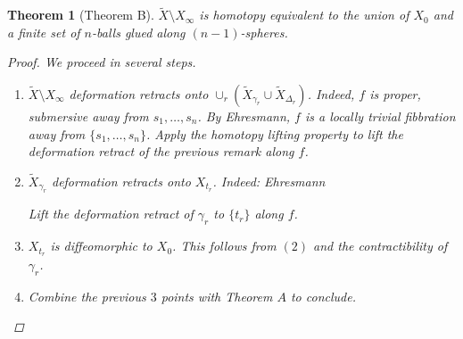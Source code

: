 \documentclass[A4paper, british]{amsart}
\theoremstyle{darkgreentheorem}
\newtheorem{thm}{Theorem}[section]
\theoremstyle{darkbluedefinition}
\theoremstyle{darkredexample}
\theoremstyle{remark}
\newcommand{\1}{\mathbbm{1}}
\begin{document}
\begin{thm}[Theorem B]
    $\tilde{X}\setminus X_{\infty}$ is homotopy equivalent to the union of $X_{0}$ and a finite set of $n$-balls glued along $(n-1)$-spheres.
    \begin{proof}
	We proceed in several steps.
	\begin{enumerate}
	    \item $\tilde{X}\setminus X_{\infty}$ deformation retracts onto $\cup_{r}(\tilde{X}_{\gamma_{r}}\cup \tilde{X}_{\Delta_{r}})$.
		Indeed, $f$ is proper, submersive away from $s_{1},\ldots,s_{n}$.
		By Ehresmann, $f$ is a locally trivial fibbration away from $\{s_{1},\ldots,s_{n}\}$.
		Apply the homotopy lifting property to lift the deformation retract of the previous remark along $f$.
	    \item $\tilde{X}_{\gamma_{r}}$ deformation retracts onto $X_{t_{r}}$.
		Indeed: Ehresmann
		\begin{center}
		\end{center}
		Lift the deformation retract of $\gamma_{r}$ to $\{t_{r}\}$ along $f$.
	    \item $X_{t_{r}}$ is diffeomorphic to $X_{0}$.
		This follows from $(2)$ and the contractibility of $\gamma_{r}$.
	    \item Combine the previous $3$ points with Theorem $A$ to conclude.
	\end{enumerate}
    \end{proof}
\end{thm}
\end{document}
